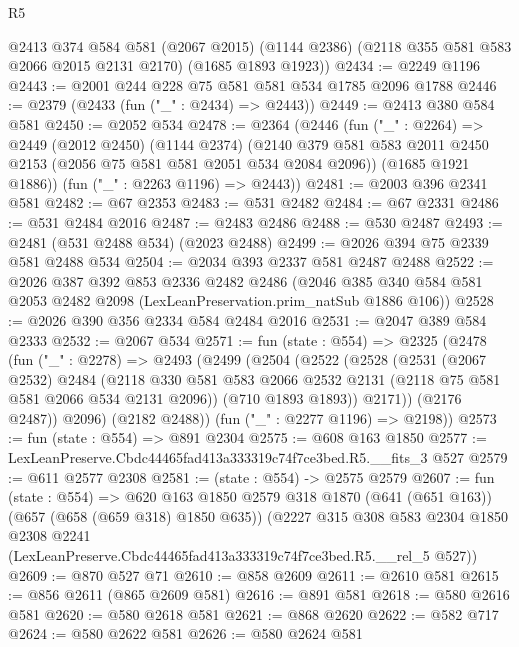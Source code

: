 \begin{lexlean}{R5}
\begin{coremodule}
    @2413
      @374
      @584
      @581
      (@2067 @2015)
      (@1144 @2386)
      (@2118 @355 @581 @583 @2066 @2015 @2131 @2170)
      (@1685 @1893 @1923))
@2434 := @2249 @1196
@2443 := @2001 @244 @228 @75 @581 @581 @534 @1785 @2096 @1788
@2446 := @2379 (@2433 (fun ("_" : @2434) => @2443))
@2449 := @2413 @380 @584 @581
@2450 := @2052 @534
@2478 := @2364
    (@2446
      (fun ("_" : @2264) =>
      @2449
        (@2012 @2450)
        (@1144 @2374)
        (@2140 @379 @581 @583 @2011 @2450 @2153 (@2056 @75 @581 @581 @2051 @534 @2084 @2096))
        (@1685 @1921 @1886))
      (fun ("_" : @2263 @1196) => @2443))
@2481 := @2003 @396 @2341 @581
@2482 := @67 @2353
@2483 := @531 @2482
@2484 := @67 @2331
@2486 := @531 @2484 @2016
@2487 := @2483 @2486
@2488 := @530 @2487
@2493 := @2481 (@531 @2488 @534) (@2023 @2488)
@2499 := @2026 @394 @75 @2339 @581 @2488 @534
@2504 := @2034 @393 @2337 @581 @2487 @2488
@2522 := @2026
    @387
    @392
    @853
    @2336
    @2482
    @2486
    (@2046 @385 @340 @584 @581 @2053 @2482 @2098 (LexLeanPreservation.prim_natSub @1886 @106))
@2528 := @2026 @390 @356 @2334 @584 @2484 @2016
@2531 := @2047 @389 @584 @2333
@2532 := @2067 @534
@2571 := fun (state : @554) =>
  @2325
    (@2478
      (fun ("_" : @2278) =>
      @2493
        (@2499
          (@2504
            (@2522
              (@2528
                (@2531
                  (@2067 @2532)
                  @2484
                  (@2118
                    @330
                    @581
                    @583
                    @2066
                    @2532
                    @2131
                    (@2118 @75 @581 @581 @2066 @534 @2131 @2096))
                  (@710 @1893 @1893))
                @2171))
            (@2176 @2487))
          @2096)
        (@2182 @2488))
      (fun ("_" : @2277 @1196) => @2198))
@2573 := fun (state : @554) => @891 @2304
@2575 := @608 @163 @1850
@2577 := LexLeanPreserve.Cbdc44465fad413a333319c74f7ce3bed.R5.__fits_3 @527
@2579 := @611 @2577 @2308
@2581 := (state : @554) -> @2575 @2579
@2607 := fun (state : @554) =>
  @620
    @163
    @1850
    @2579
    @318
    @1870
    (@641 (@651 @163))
    (@657 (@658 (@659 @318) @1850 @635))
    (@2227
      @315
      @308
      @583
      @2304
      @1850
      @2308
      @2241
      (LexLeanPreserve.Cbdc44465fad413a333319c74f7ce3bed.R5.__rel_5 @527))
@2609 := @870 @527 @71
@2610 := @858 @2609
@2611 := @2610 @581
@2615 := @856 @2611 (@865 @2609 @581)
@2616 := @891 @581
@2618 := @580 @2616 @581
@2620 := @580 @2618 @581
@2621 := @868 @2620
@2622 := @582 @717
@2624 := @580 @2622 @581
@2626 := @580 @2624 @581

\end{coremodule}
\end{lexlean}
